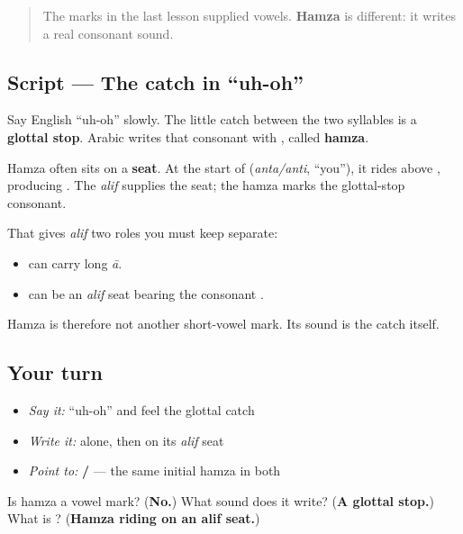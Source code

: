 \label{lesson:AR-W06-hamza}



\begin{quote}
The marks in the last lesson supplied vowels. \textbf{Hamza} is different: it writes a real consonant sound.
\end{quote}

\subsection*{Script — The catch in “uh-oh”}
Say English “uh-oh” slowly. The little catch between the two syllables is a \textbf{glottal stop}. Arabic writes that consonant with \textbf{}, called \textbf{hamza}.

Hamza often sits on a \textbf{seat}. At the start of \textbf{} (\emph{anta/anti}, “you”), it rides above \textbf{}, producing \textbf{}. The \emph{alif} supplies the seat; the hamza marks the glottal-stop consonant.

That gives \emph{alif} two roles you must keep separate:

\begin{itemize}
\raggedright
  \item \textbf{} can carry long \emph{ā}.
  \item \textbf{} can be an \emph{alif} seat bearing the consonant \textbf{}.
\end{itemize}

Hamza is therefore not another short-vowel mark. Its sound is the catch itself.

\subsection*{Your turn}
\begin{itemize}
\raggedright
  \item \emph{Say it:} “uh-oh” and feel the glottal catch
  \item \emph{Write it:} \textbf{} alone, then \textbf{} on its \emph{alif} seat
  \item \emph{Point to:} \textbf{ / } — the same initial hamza in both
\end{itemize}

\begin{tcolorbox}[breakable,colback=teal!4,colframe=teal!35!black,title={Before you move on}]
Is hamza a vowel mark? (\textbf{No.}) What sound does it write? (\textbf{A glottal stop.}) What is \textbf{}? (\textbf{Hamza riding on an alif seat.})
\end{tcolorbox}
